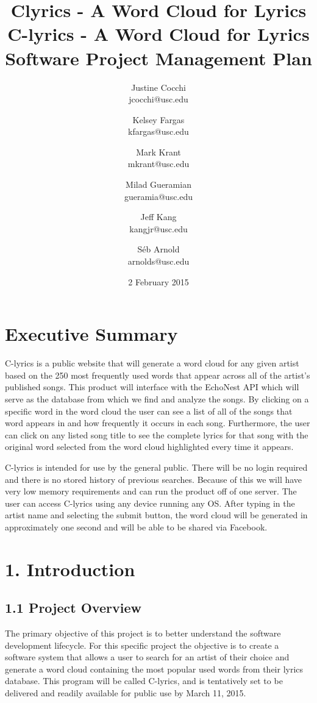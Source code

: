 \documentclass[]{article}
\title{Clyrics - A Word Cloud for Lyrics}
\author{Justine Cocchi\\jcocchi@usc.edu \and Kelsey Fargas\\kfargas@usc.edu \and Mark Krant \\ mkrant@usc.edu\and Milad Gueramian\\gueramia@usc.edu \and Jeff Kang\\kangjr@usc.edu \and Séb Arnold\\arnolds@usc.edu}
\date{2 February 2015}
\title{%
	C-lyrics - A Word Cloud for Lyrics \\
	\large Software Project Management Plan}
\begin{document}
\maketitle

\pagebreak

\tableofcontents
\setcounter{tocdepth}{4}

\pagebreak

\section{Executive Summary}\label{executive-summary}

C-lyrics is a public website that will generate a word cloud for any given artist based on the 250 most frequently used words that appear across all of the artist’s published songs. This product will interface with the EchoNest API which will serve as the database from which we find and analyze the songs. By clicking on a specific word in the word cloud the user can see a list of all of the songs that word appears in and how frequently it occurs in each song. Furthermore, the user can click on any listed song title to see the complete lyrics for that song with the original word selected from the word cloud highlighted every time it appears. 

C-lyrics is intended for use by the general public. There will be no login required and there is no stored history of previous searches. Because of this we will have very low memory requirements and can run the product off of one server. The user can access C-lyrics using any device running any OS. After typing in the artist name and selecting the submit button, the word cloud will be generated in approximately one second and will be able to be shared via Facebook. 

\pagebreak

\section{1. Introduction}\label{introduction}

\subsection{1.1 Project Overview}\label{project-overview}

The primary objective of this project is to better understand the
software development lifecycle. For this specific project the objective
is to create a software system that allows a user to search for an
artist of their choice and generate a word cloud containing the most
popular used words from their lyrics database. This program will be
called C-lyrics, and is tentatively set to be delivered and readily
available for public use by March 11, 2015.
\end{document}
